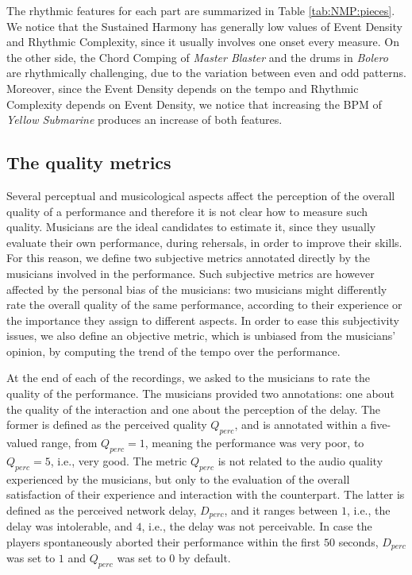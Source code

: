 The rhythmic features for each part are summarized in Table 
\ref{tab:NMP:pieces}. We notice that the Sustained Harmony has generally low values of Event Density and Rhythmic Complexity, since it usually involves one onset every measure. On the other side, the Chord Comping of \textit{Master Blaster} and the drums in \textit{Bolero} are rhythmically challenging, due to the variation between even and odd patterns. Moreover, since the Event Density depends on the tempo and Rhythmic Complexity depends on Event Density, we notice that increasing the BPM of \textit{Yellow Submarine} produces an increase of both features.





\subsection{The quality metrics}\label{sec:NMP:codomain}
Several perceptual and musicological aspects affect the perception of the overall quality of a performance and therefore it is not clear how to measure such quality. Musicians are the ideal candidates to estimate it, since they usually evaluate their own performance, during rehersals, in order to improve their skills. For this reason, we define two subjective metrics annotated directly by the musicians involved in the performance. Such subjective metrics are however affected by the personal bias of the musicians: two musicians might differently rate the overall quality of the same performance, according to their experience or the importance they assign to different aspects. In order to ease this subjectivity issues, we also define an objective metric, which is unbiased from the musicians' opinion, by computing the trend of the tempo over the performance.

At the end of each of the recordings, we asked to the musicians to rate the quality of the performance. The musicians provided two annotations: one about the quality of the interaction and one about the perception of the delay. The former is defined as the perceived quality $Q_{perc}$, and is annotated within a five-valued range, from $Q_{perc}=1$, meaning the performance was very poor, to $Q_{perc}=5$, i.e., very good. The metric $Q_{perc}$ is not related to the audio quality experienced by the musicians, but only to the evaluation of the overall satisfaction of their experience and interaction with the counterpart. The latter is defined as the perceived network delay, $D_{perc}$, and it ranges between $1$, i.e., the delay was intolerable, and $4$, i.e., the delay was not perceivable. In case the players spontaneously aborted their performance within the first $50$ seconds, $D_{perc}$ was set to $1$ and $Q_{perc}$ was set to $0$ by default. 

